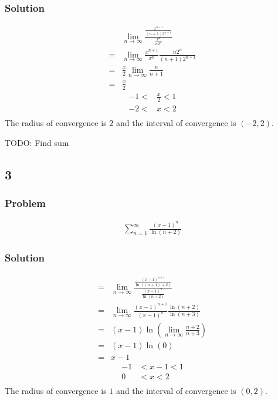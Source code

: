 \documentclass[12pt]{article}
\newcommand{\round}[1]{\left(       #1 \right)      }
\begin{document}
\subsubsection*{Solution}
\begin{align*}
     & \lim_{n\to\infty} \frac{\frac{x^{n+1}}{(n+1)2^{n+1}}}{\frac{x^n}{n2^n}} \\
    =& \lim_{n\to\infty} \frac{x^{n+1}}{x^n} \frac{n2^n}{(n+1)2^{n+1}} \\
    =& \frac{x}{2} \lim_{n\to\infty} \frac{n}{n+1} \\
    =& \frac{x}{2}
\end{align*}
\begin{align*}
    -1 < &\frac{x}{2} < 1 \\
    -2 < &x < 2 \\
\end{align*}
The radius of convergence is $2$ and the interval of convergence is $(-2, 2)$.

TODO: Find sum


\subsection*{3}
\subsubsection*{Problem}
\begin{align*}
    \sum_{n=1}^\infty \frac{(x-1)^n}{\ln(n+2)}
\end{align*}

\subsubsection*{Solution}
\begin{align*}
    =& \lim_{n\to\infty} \frac{\frac{(x-1)^{n+1}}{\ln((n+1)+2)}}{\frac{(x-1)^n}{\ln(n+2)}} \\
    =& \lim_{n\to\infty} \frac{(x-1)^{n+1}}{(x-1)^n} \frac{\ln(n+2)}{\ln(n+3)} \\
    =& (x-1) \ln\round{\lim_{n\to\infty} \frac{n+2}{n+3}} \\
    =& (x-1) \ln(0) \\
    =& x-1
\end{align*}
\begin{align*}
    -1 &< x-1 < 1 \\
    0 &< x < 2 \\
\end{align*}
The radius of convergence is $1$ and the interval of convergence is $(0,2)$.
\end{document}

